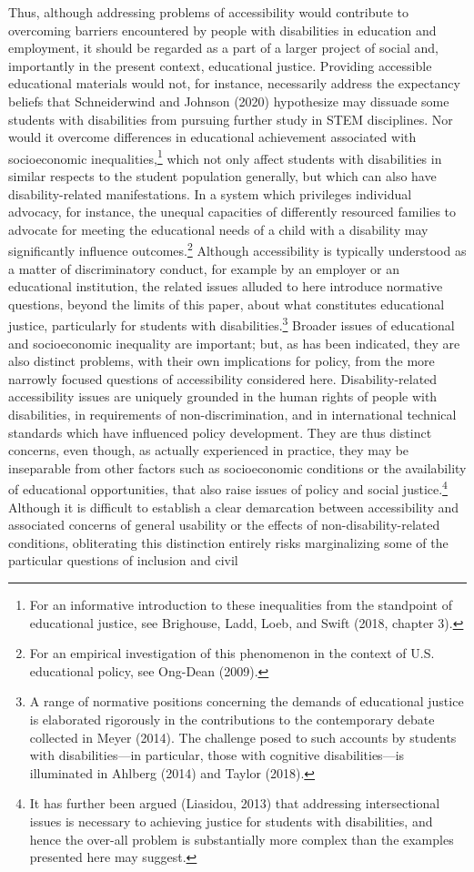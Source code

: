 \documentclass{sig-alternate} %
\begin{document}
\begin{large}
Thus, although addressing problems of accessibility would contribute to overcoming barriers encountered by people with disabilities in education and employment, it should be regarded as a part of a larger project of social and, importantly in the present context, educational justice. Providing accessible educational materials would not, for instance, necessarily address the expectancy beliefs that Schneiderwind and Johnson (2020) hypothesize may dissuade some students with disabilities from pursuing further study in STEM disciplines. Nor would it overcome differences in educational achievement associated with socioeconomic inequalities,\footnote{For an informative introduction to these inequalities from the standpoint of educational justice, see Brighouse, Ladd, Loeb, and Swift (2018, chapter 3).} which not only affect students with disabilities in similar respects to the student population generally, but which can also have disability-related manifestations. In a system which privileges individual advocacy, for instance, the unequal capacities of differently resourced families to advocate for meeting the educational needs of a child with a disability may significantly influence outcomes.\footnote{For an empirical investigation of this phenomenon in the context of U.S. educational policy, see Ong-Dean (2009).} Although accessibility is typically understood as a matter of discriminatory conduct, for example by an employer or an educational institution, the related issues alluded to here introduce normative questions, beyond the limits of this paper, about what constitutes educational justice, particularly for students with disabilities.\footnote{A range of normative positions concerning the demands of educational justice is elaborated rigorously in the contributions to the contemporary debate collected in Meyer (2014). The challenge posed to such accounts by students with disabilities—in particular, those with cognitive disabilities—is illuminated in Ahlberg (2014) and Taylor (2018).} Broader issues of educational and socioeconomic inequality are important; but, as has been indicated, they are also distinct problems, with their own implications for policy, from the more narrowly focused questions of accessibility considered here. Disability-related accessibility issues are uniquely grounded in the human rights of people with disabilities, in requirements of non-discrimination, and in international technical standards which have influenced policy development. They are thus distinct concerns, even though, as actually experienced in practice, they may be inseparable from other factors such as socioeconomic conditions or the availability of educational opportunities, that also raise issues of policy and social justice.\footnote{It has further been argued (Liasidou, 2013) that addressing intersectional issues is necessary to achieving justice for students with disabilities, and hence the over-all problem is substantially more complex than the examples presented here may suggest.} Although it is difficult to establish a clear demarcation between accessibility and associated concerns of general usability or the effects of non-disability-related conditions, obliterating this distinction entirely risks marginalizing some of the particular questions of inclusion and civil 
\end{large}
\end{document}
